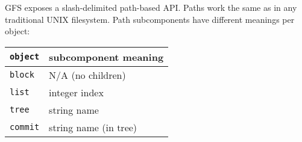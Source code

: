 \documentclass{sig-alternate}
\begin{document}
GFS exposes a slash-delimited path-based API. Paths work the same as in any
traditional UNIX filesystem. Path subcomponents have different meanings per
object:

\begin{center}
\begin{tabular}{ll}
  \texttt{object} & subcomponent meaning \\
  \hline
  \hline
  \texttt{block}  & N/A (no children) \\
  \texttt{list}   & integer index \\
  \texttt{tree}   & string name \\
  \texttt{commit} & string name (in tree) \\
\end{tabular}
\end{center}
\end{document}
